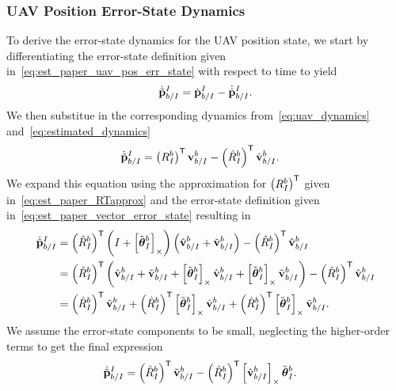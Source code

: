 \subsubsection{UAV Position Error-State Dynamics}
To derive the error-state dynamics for the UAV position state, we start by
differentiating the error-state definition given
in~\eqref{eq:est_paper_uav_pos_err_state} with respect to time to yield
\begin{equation}
  \dot{\tilde{\boldsymbol{\mathrm{p}}}}_{b/I}^I = \dot{\boldsymbol{\mathrm{p}}}_{b/I}^I - \dot{\hat{\boldsymbol{\mathrm{p}}}}_{b/I}^I.
\end{equation}
We then substitue in the corresponding dynamics from~\eqref{eq:uav_dynamics}
and~\eqref{eq:estimated_dynamics}
\begin{align}
  \dot{\tilde{\boldsymbol{\mathrm{p}}}}_{b/I}^I
  &=
  \left( R_I^b \right)^{\mathsf{T}} \boldsymbol{\mathrm{v}}_{b/I}^b
  - \left( \hat{R}_I^b \right)^{\mathsf{T}} \hat{\boldsymbol{\mathrm{v}}}_{b/I}^b.
\end{align}
We expand this equation using the approximation for $\left( R_I^b \right)^{\mathsf{T}}$ given
in~\eqref{eq:est_paper_RTapprox} and the error-state definition given
in~\eqref{eq:est_paper_vector_error_state} resulting in
\begin{align}
  \dot{\tilde{\boldsymbol{\mathrm{p}}}}_{b/I}^I
  &=
  \left( \hat{R}_I^b \right)^{\mathsf{T}}
  \left( I + \left[ \tilde{\boldsymbol{\mathrm{\theta}}}_I^b \right]_{\times} \right)
  \left( \hat{\boldsymbol{\mathrm{v}}}_{b/I}^b + \tilde{\boldsymbol{\mathrm{v}}}_{b/I}^b \right)
  - \left( \hat{R}_I^b \right)^{\mathsf{T}} \hat{\boldsymbol{\mathrm{v}}}_{b/I}^b \\
  &=
  \left( \hat{R}_I^b \right)^{\mathsf{T}}
  \left( \hat{\boldsymbol{\mathrm{v}}}_{b/I}^b + \tilde{\boldsymbol{\mathrm{v}}}_{b/I}^b
  + \left[ \tilde{\boldsymbol{\mathrm{\theta}}}_I^b \right]_{\times} \hat{\boldsymbol{\mathrm{v}}}_{b/I}^b
  + \left[ \tilde{\boldsymbol{\mathrm{\theta}}}_I^b \right]_{\times} \tilde{\boldsymbol{\mathrm{v}}}_{b/I}^b \right)
  - \left( \hat{R}_I^b \right)^{\mathsf{T}} \hat{\boldsymbol{\mathrm{v}}}_{b/I}^b \\
  &=
  \left( \hat{R}_I^b \right)^{\mathsf{T}} \tilde{\boldsymbol{\mathrm{v}}}_{b/I}^b
  + \left( \hat{R}_I^b \right)^{\mathsf{T}} \left[ \tilde{\boldsymbol{\mathrm{\theta}}}_I^b \right]_{\times} \hat{\boldsymbol{\mathrm{v}}}_{b/I}^b
  + \left( \hat{R}_I^b \right)^{\mathsf{T}} \left[ \tilde{\boldsymbol{\mathrm{\theta}}}_I^b \right]_{\times} \tilde{\boldsymbol{\mathrm{v}}}_{b/I}^b.
\end{align}
We assume the error-state components to be small, neglecting the higher-order
terms to get the final expression
\begin{align}
  \dot{\tilde{\boldsymbol{\mathrm{p}}}}_{b/I}^I
  &=
  \left( \hat{R}_I^b \right)^{\mathsf{T}} \tilde{\boldsymbol{\mathrm{v}}}_{b/I}^b
  - \left( \hat{R}_I^b \right)^{\mathsf{T}} \left[ \hat{\boldsymbol{\mathrm{v}}}_{b/I}^b \right]_{\times}
  \tilde{\boldsymbol{\mathrm{\theta}}}_I^b.
\end{align}

